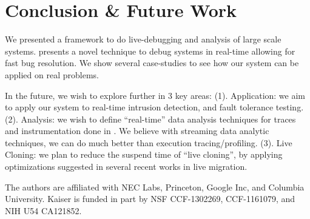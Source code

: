 \section{Conclusion \& Future Work}
\label{sec:conclusion}


We presented \parikshan a framework to do live-debugging and analysis of large scale systems.
\parikshan presents a novel technique to debug systems in real-time allowing for fast bug resolution.
We show several case-studies to see how our system can be applied on real problems.

In the future, we wish to explore \parikshan further in 3 key areas: (1). Application: we aim to apply our system to real-time intrusion detection, and fault tolerance testing.
(2). Analysis: we wish to define ``real-time'' data analysis techniques for traces and instrumentation done in \parikshan.
We believe with streaming data analytic techniques, we can do much better than execution tracing/profiling.
(3). Live Cloning: we plan to reduce the suspend time of ``live cloning'', by applying optimizations suggested in several recent works in live migration.


The authors are affiliated with NEC Labs, Princeton, Google Inc, and Columbia University. 
Kaiser is funded in part by NSF CCF-1302269, CCF-1161079, and NIH U54 CA121852.
